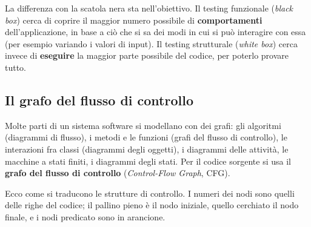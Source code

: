 La differenza con la scatola nera sta nell'obiettivo. Il testing funzionale (\textit{black box}) cerca di coprire il
maggior numero possibile di \textbf{comportamenti} dell'applicazione, in base a ciò che si sa dei modi in cui si può
interagire con essa (per esempio variando i valori di input). Il testing strutturale (\textit{white box}) cerca invece di
\textbf{eseguire} la maggior parte possibile del codice, per poterlo provare tutto.

\subsection{Il grafo del flusso di controllo}

Molte parti di un sistema software si modellano con dei grafi: gli algoritmi (diagrammi di flusso), i metodi e le
funzioni (grafi del flusso di controllo), le interazioni fra classi (diagrammi degli oggetti), i diagrammi delle
attività, le macchine a stati finiti, i diagrammi degli stati. Per il codice sorgente si usa il \textbf{grafo del
flusso di controllo} (\textit{Control-Flow Graph}, CFG).


Ecco come si traducono le strutture di controllo. I numeri dei nodi sono quelli delle righe del codice; il pallino
pieno è il nodo iniziale, quello cerchiato il nodo finale, e i nodi predicato sono in arancione.

